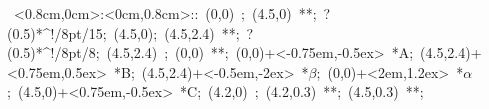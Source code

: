 \hbox{
\xy    <0.8cm,0cm>:<0cm,0.8cm>::
       (0,0) ; (4.5,0) **\dir{-}; ?(0.5)*^!/8pt/{15};
       (4.5,0); (4.5,2.4) **\dir{-}; ?(0.5)*^!/8pt/{8}; 
       (4.5,2.4) ; (0,0) **\dir{-};  
       (0,0)+<-0.75em,-0.5ex> *{A};
       (4.5,2.4)+<0.75em,0.5ex> *{B};
       (4.5,2.4)+<-0.5em,-2ex> *\hbox{$\beta$};       
       (0,0)+<2em,1.2ex> *\hbox{$\alpha$};
       (4.5,0)+<0.75em,-0.5ex> *{C};
       (4.2,0) ; (4.2,0.3) **\dir{-}; (4.5,0.3) **\dir{-};       
\endxy}
	   
